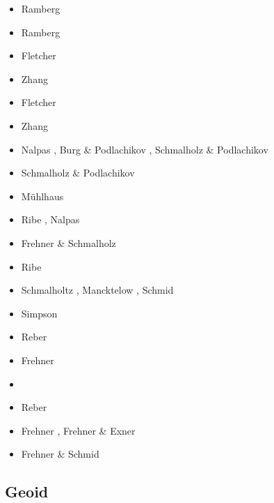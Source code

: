 
\begin{scriptsize}
\begin{itemize}
\item[\nineteenseventy] Ramberg \cite{ramb70}
\item[\nineteenseventyone] Ramberg \cite{ramb71}
\item[\nineteenninetyone] Fletcher \cite{flet91}
\item[\nineteenninetythree] Zhang \etal \cite{zhhj93}
\item[\nineteenninetyfive] Fletcher \cite{flet95}
\item[\nineteenninetysix] Zhang \etal \cite{zhho96}
\item[\nineteenninetynine] Nalpas \etal \cite{nagg99}, Burg \& Podlachikov \cite{bupo99},
                           Schmalholz \& Podlachikov \cite{scpo99}
\item[\twothousandone] Schmalholz \& Podlachikov \cite{scpo01,scpo01b}
\item[\twothousandtwo] M\"{u}hlhaus  \etal \cite{mumh02}
\item[\twothousandthree] Ribe \cite{ribe03}, Nalpas \etal \cite{nagv03}
\item[\twothousandsix] Frehner \& Schmalholz \cite{frsc06}
\item[\twothousandseven] Ribe \etal \cite{risr07}
\item[\twothousandeight] Schmalholtz \cite{schm08}, Mancktelow \cite{manc08}, Schmid \etal \cite{scdk08}
\item[\twothousandnine] Simpson \cite{simp09}
\item[\twothousandten] Reber \etal \cite{resb10}
\item[\twothousandeleven] Frehner \cite{freh11}
\item[\twothousandtwelve] \cite{reds12}\cite{grsc12}\cite{scsc12}
\item[\twothousandthirteen] Reber \etal \cite{regc13}
\item[\twothousandfourteen] Frehner \cite{freh14}, Frehner \& Exner \cite{frex14}
\item[\twothousandsixteen] Frehner \& Schmid \cite{frsc16}
\end{itemize}
\end{scriptsize}

\subsection{Geoid}

